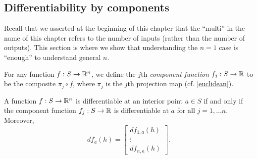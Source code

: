 \begin{comment}
\begin{proof}
Observe that
\[ \frac{|\ell(r(v))|}{|v|} \leq \frac{\|\ell\| \cdot |r(v)|}{|v|}. \]
Since $|r(v)| = o(|v|)$, we see that the right-hand side tends to 0 as $v \to 0$. The squeeze theorem thus guarantees that $|\ell(r(v))| = o(|v|)$ also. 
\end{proof}
\end{comment}

\subsection{Differentiability by components}

Recall that we asserted at the beginning of this chapter that the ``multi'' in the name of this chapter refers to the number of inputs (rather than the number of outputs). This section is where we show that understanding the $n = 1$ case is ``enough'' to understand general $n$.

\begin{definition} 
	For any function $f : S \to \mathbb{R}^n$, we define the $j$th \emph{component function} $f_j : S \to \mathbb{R}$ to be the composite $\pi_j \circ f$, where $\pi_j$ is the $j$th projection map (cf. \cref{euclidean}).
\end{definition}

\begin{proposition} \label{differentiable-by-components}
	A function $f : S \to \mathbb{R}^n$ is differentiable at an interior point $a \in S$ if and only if the component function $f_j : S \to \mathbb{R}$ is differentiable at $a$ for all $j = 1, \dotsc n$. Moreover,
	\begin{equation} \label{derivative-of-components} df_a(h) = \begin{bmatrix} df_{1,a}(h) \\ \vdots \\ df_{n,a}(h) \end{bmatrix}. \end{equation}
\end{proposition}


